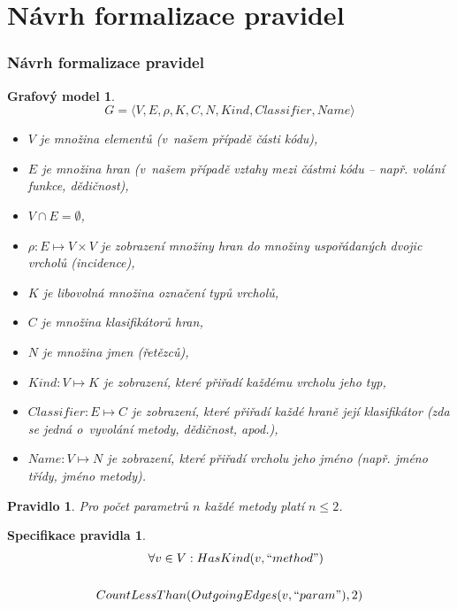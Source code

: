 \documentclass{beamer}
\newtheorem*{rulespec}{Pravidlo}
\newtheorem*{rulemathspec}{Specifikace pravidla}
\newtheorem*{graphmodel}{Grafový model}
\begin{document}
\section{Návrh formalizace pravidel}
\begin{frame}
  \frametitle{Návrh formalizace pravidel}
   {
    \begin{graphmodel}
      \begin{displaymath}
        G = \langle V, E, \rho, K, C, N, \mathit{Kind}, \mathit{Classifier}, \mathit{Name}\rangle
      \end{displaymath}
      \tiny
      \begin{itemize}
      \item $V$ je množina elementů (v~našem případě části kódu),
      \item $E$ je množina hran (v~našem případě vztahy mezi částmi kódu -- např. volání funkce, dědičnost),
      \item $V \cap E = \emptyset$,
      \item $\rho: E \mapsto V \times V$ je zobrazení množiny hran do množiny uspořádaných dvojic vrcholů (incidence),
      \item $K$ je libovolná množina označení typů vrcholů,
      \item $C$ je množina klasifikátorů hran,
      \item $N$ je množina jmen (řetězců),
      \item $\mathit{Kind}: V \mapsto K$ je zobrazení, které přiřadí každému vrcholu jeho typ,
      \item $\mathit{Classifier}: E \mapsto C$ je zobrazení, které přiřadí každé hraně její klasifikátor (zda se jedná o~vyvolání metody, dědičnost, apod.),
      \item $\mathit{Name}: V \mapsto N$ je zobrazení, které přiřadí vrcholu jeho jméno (např. jméno třídy, jméno metody).
      \end{itemize}
    \end{graphmodel}
  }
   {
    \begin{rulespec}
      Pro počet parametrů $n$ každé metody platí $n \leq 2$.
    \end{rulespec}
    \begin{rulemathspec}
      \begin{align*}
        \forall v \in V &: HasKind(v, ``method") \\
        \\
        CountLessThan&(OutgoingEdges(v, ``param"), 2)
      \end{align*}

\end{rulemathspec}}
\end{frame}
\end{document}
